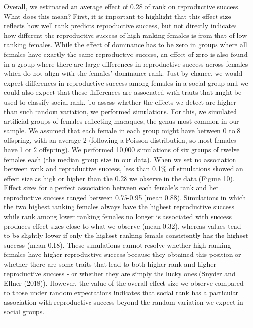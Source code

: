 \documentclass[
]{article}
\begin{document}
Overall, we estimated an average effect of 0.28 of rank on reproductive
success. What does this mean? First, it is important to highlight that
this effect size reflects how well rank predicts reproductive success,
but not directly indicates how different the reproductive success of
high-ranking females is from that of low-ranking females. While the
effect of dominance has to be zero in groups where all females have
exactly the same reproductive success, an effect of zero is also found
in a group where there are large differences in reproductive success
across females which do not align with the females' dominance rank. Just
by chance, we would expect differences in reproductive success among
females in a social group and we could also expect that these
differences are associated with traits that might be used to classify
social rank. To assess whether the effects we detect are higher than
such random variation, we performed simulations. For this, we simulated
artificial groups of females reflecting macaques, the genus most common
in our sample. We assumed that each female in each group might have
between 0 to 8 offspring, with an average 2 (following a Poisson
distribution, so most females have 1 or 2 offspring). We performed
10,000 simulations of six groups of twelve females each (the median
group size in our data). When we set no association between rank and
reproductive success, less than 0.1\% of simulations showed an effect
size as high or higher than the 0.28 we observe in the data (Figure 10).
Effect sizes for a perfect association between each female's rank and
her reproductive success ranged between 0.75-0.95 (mean 0.88).
Simulations in which the two highest ranking females always have the
highest reproductive success while rank among lower ranking females no
longer is associated with success produces effect sizes close to what we
observe (mean 0.32), whereas values tend to be slightly lower if only
the highest ranking female consistently has the highest success (mean
0.18). These simulations cannot resolve whether high ranking females
have higher reproductive success because they obtained this position or
whether there are some traits that lead to both higher rank and higher
reproductive success - or whether they are simply the lucky ones (Snyder
and Ellner (2018)). However, the value of the overall effect size we
observe compared to those under random expectations indicates that
social rank has a particular association with reproductive success
beyond the random variation we expect in social groups.

\begin{center}\rule{0.5\linewidth}{0.5pt}\end{center}
\end{document}
